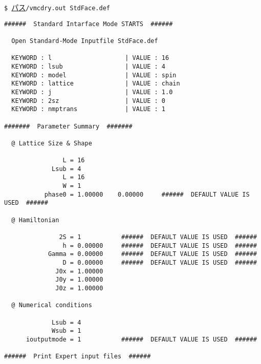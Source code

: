 \vspace{1cm}\hspace{-0.7cm}
\verb|$ |\underline{パス}\verb|/vmcdry.out StdFace.def|
\small
\begin{verbatim}
######  Standard Intarface Mode STARTS  ######

  Open Standard-Mode Inputfile StdFace.def 

  KEYWORD : l                    | VALUE : 16 
  KEYWORD : lsub                 | VALUE : 4 
  KEYWORD : model                | VALUE : spin 
  KEYWORD : lattice              | VALUE : chain 
  KEYWORD : j                    | VALUE : 1.0 
  KEYWORD : 2sz                  | VALUE : 0 
  KEYWORD : nmptrans             | VALUE : 1 

#######  Parameter Summary  #######

  @ Lattice Size & Shape

                L = 16 
             Lsub = 4         
                L = 16        
                W = 1         
           phase0 = 1.00000    0.00000     ######  DEFAULT VALUE IS USED  ######

  @ Hamiltonian 

               2S = 1           ######  DEFAULT VALUE IS USED  ######
                h = 0.00000     ######  DEFAULT VALUE IS USED  ######
            Gamma = 0.00000     ######  DEFAULT VALUE IS USED  ######
                D = 0.00000     ######  DEFAULT VALUE IS USED  ######
              J0x = 1.00000   
              J0y = 1.00000   
              J0z = 1.00000   

  @ Numerical conditions

             Lsub = 4         
             Wsub = 1         
      ioutputmode = 1           ######  DEFAULT VALUE IS USED  ######

######  Print Expert input files  ######


\end{verbatim}
